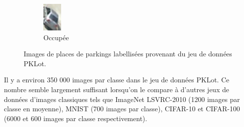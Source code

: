 \documentclass[12pt]{article}
\begin{document}
\begin{figure}[htbp]
\begin{subfigure}{0.2\textwidth}
        \includegraphics[width=\textwidth]{figures/datasets/2013-01-29_18_46_21_021.jpg}
        \caption{Occupée}
    \end{subfigure}
    \caption{Images de places de parkings labellisées provenant du jeu de données PKLot.}
    \label{fig:pklot_individual}
\end{figure}

Il y a environ 350 000 images par classe dans le jeu de données PKLot. Ce nombre semble largement suffisant lorsqu'on le compare à d'autres jeux de données d'images classiques tels que ImageNet LSVRC-2010 \citep{ILSVRC15} (1200 images par classe en moyenne), MNIST \citep{deng2012mnist} (700 images par classe), CIFAR-10 et CIFAR-100 \citep{Krizhevsky09learningmultiple} (6000 et 600 images par classe respectivement).
\end{document}
